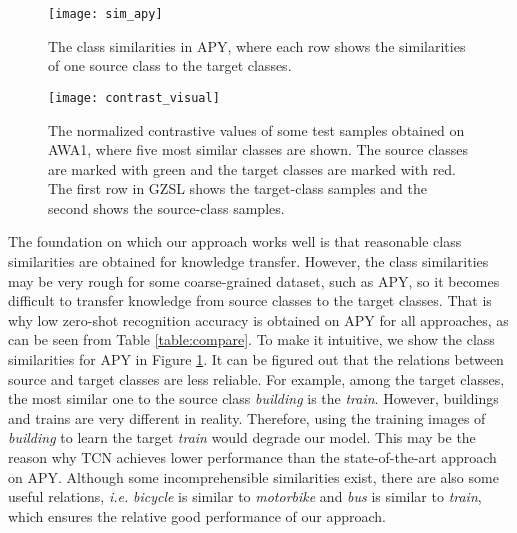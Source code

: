 \documentclass[10pt,twocolumn,letterpaper]{article}
\begin{document}
\begin{figure}[t]
\centering
\texttt{[image: sim\_apy]}
\caption{The class similarities in APY, where each row shows the similarities of one source class to the target classes.}
\label{fig:sim_apy}
\end{figure}

\begin{figure*}[t]
\centering
\texttt{[image: contrast\_visual]}
\caption{The normalized contrastive values of some test samples obtained on AWA1, where five most similar classes are shown. The source classes are marked with green and the target classes are marked with red. The first row in GZSL shows the target-class samples and the second shows the source-class samples.}
\label{fig:contrast_visual}
\end{figure*}

The foundation on which our approach works well is that reasonable class similarities are obtained for knowledge transfer. However, the class similarities may be very rough for some coarse-grained dataset, such as APY, so it becomes difficult to transfer knowledge from source classes to the target classes. That is why low zero-shot recognition accuracy is obtained on APY for all approaches, as can be seen from Table \ref{table:compare}. To make it intuitive, we show the class similarities for APY in Figure \ref{fig:sim_apy}. It can be figured out that the relations between source and target classes are less reliable. For example, among the target classes, the most similar one to the source class \emph{building} is the \emph{train}. However, buildings and trains are very different in reality. Therefore, using the training images of \emph{building} to learn the target \emph{train} would degrade our model. This may be the reason why TCN achieves lower performance than the state-of-the-art approach on APY. Although some incomprehensible similarities exist, there are also some useful relations, \emph{i.e.}  \emph{bicycle} is similar to \emph{motorbike} and \emph{bus} is similar to \emph{train}, which ensures the relative good performance of our approach.
\end{document}
